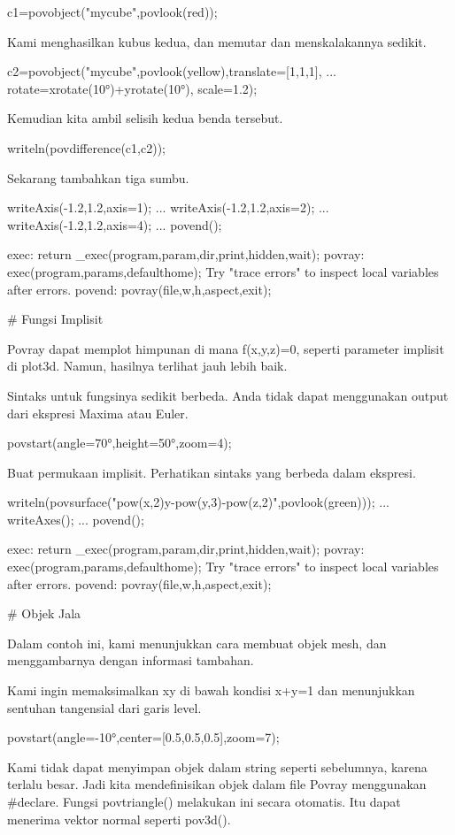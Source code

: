 \documentclass{article}
\begin{document}
\>c1=povobject("mycube",povlook(red));


Kami menghasilkan kubus kedua, dan memutar dan menskalakannya sedikit.


\>c2=povobject("mycube",povlook(yellow),translate=[1,1,1], ...  
\>     rotate=xrotate(10°)+yrotate(10°), scale=1.2);


Kemudian kita ambil selisih kedua benda tersebut.


\>writeln(povdifference(c1,c2));


Sekarang tambahkan tiga sumbu.


\>writeAxis(-1.2,1.2,axis=1); ...  
\>   writeAxis(-1.2,1.2,axis=2); ...  
\>   writeAxis(-1.2,1.2,axis=4); ...  
\>   povend();


    exec:
        return _exec(program,param,dir,print,hidden,wait);
    povray:
        exec(program,params,defaulthome);
    Try "trace errors" to inspect local variables after errors.
    povend:
        povray(file,w,h,aspect,exit); 

# Fungsi Implisit

Povray dapat memplot himpunan di mana f(x,y,z)=0, seperti parameter
implisit di plot3d. Namun, hasilnya terlihat jauh lebih baik.


Sintaks untuk fungsinya sedikit berbeda. Anda tidak dapat menggunakan
output dari ekspresi Maxima atau Euler.


\>povstart(angle=70°,height=50°,zoom=4);


Buat permukaan implisit. Perhatikan sintaks yang berbeda dalam
ekspresi.


\>writeln(povsurface("pow(x,2)\*y-pow(y,3)-pow(z,2)",povlook(green))); ...  
\>   writeAxes(); ...  
\>   povend();


    exec:
        return _exec(program,param,dir,print,hidden,wait);
    povray:
        exec(program,params,defaulthome);
    Try "trace errors" to inspect local variables after errors.
    povend:
        povray(file,w,h,aspect,exit); 

# Objek Jala

Dalam contoh ini, kami menunjukkan cara membuat objek mesh, dan
menggambarnya dengan informasi tambahan.


Kami ingin memaksimalkan xy di bawah kondisi x+y=1 dan menunjukkan
sentuhan tangensial dari garis level.


\>povstart(angle=-10°,center=[0.5,0.5,0.5],zoom=7);


Kami tidak dapat menyimpan objek dalam string seperti sebelumnya,
karena terlalu besar. Jadi kita mendefinisikan objek dalam file Povray
menggunakan #declare. Fungsi povtriangle() melakukan ini secara
otomatis. Itu dapat menerima vektor normal seperti pov3d().
\end{document}
